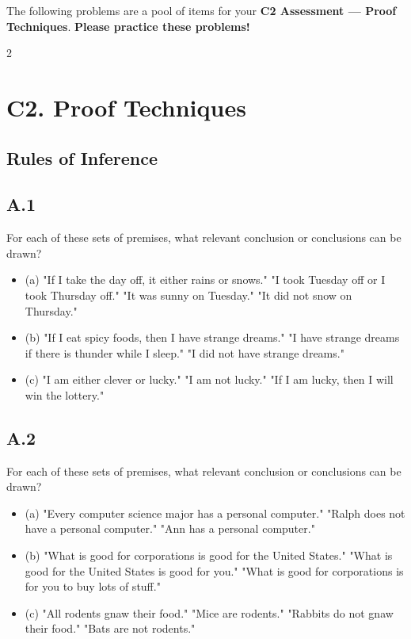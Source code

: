 \documentclass[9pt]{article}
\begin{document}
The following problems are a pool of items for your \textbf{C2 Assessment — Proof Techniques}. \textbf{Please practice these problems!}

\begin{multicols}{2}

\section*{C2. Proof Techniques}
\subsection*{Rules of Inference}
\subsection*{A.1}
For each of these sets of premises, what relevant conclusion or conclusions can be drawn?
\begin{itemize}
  \item (a) "If I take the day off, it either rains or snows." "I took Tuesday off or I took Thursday off." "It was sunny on Tuesday." "It did not snow on Thursday."
  \item (b) "If I eat spicy foods, then I have strange dreams." "I have strange dreams if there is thunder while I sleep." "I did not have strange dreams."
  \item (c) "I am either clever or lucky." "I am not lucky." "If I am lucky, then I will win the lottery."
\end{itemize}

\subsection*{A.2}
For each of these sets of premises, what relevant conclusion or conclusions can be drawn?
\begin{itemize}
  \item (a) "Every computer science major has a personal computer." "Ralph does not have a personal computer." "Ann has a personal computer."
  \item (b) "What is good for corporations is good for the United States." "What is good for the United States is good for you." "What is good for corporations is for you to buy lots of stuff."
  \item (c) "All rodents gnaw their food." "Mice are rodents." "Rabbits do not gnaw their food." "Bats are not rodents."
\end{itemize}


\end{multicols}
\end{document}
